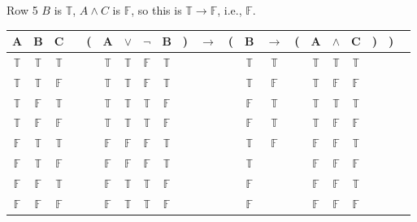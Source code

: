 \documentclass[
  ignorenonframetext,
]{beamer}
\renewcommand{\,}{\text{, }}
\def\True{\mathbb{T}}
\def\False{\mathbb{F}}
\begin{document}
\begin{frame}{Row 5}
\protect\hypertarget{row-5}{}
\(B\) is \(\True\), \(A \wedge C\) is \(\False\), so this is
\(\True \rightarrow \False\), i.e., \(\False\).

\begin{center}

\begin{tabular}{@{ }c@{ }@{ }c@{ }@{ }c | c@{ }@{}c@{}@{ }c@{ }@{ }c@{ }@{ }c@{ }@{ }c@{ }@{}c@{}@{ }c@{ }@{}c@{}@{ }c@{ }@{ }c@{ }@{}c@{}@{ }c@{ }@{ }c@{ }@{ }c@{ }@{}c@{}@{}c@{}@{ }c}
A & B & C &  & ( & A & $\vee$ & $\neg$ & B & ) & $\rightarrow$ & ( & B & $\rightarrow$ & ( & A & $\wedge$ & C & ) & ) & \\
\hline 
 $\True$ & $\True$ & $\True$ &  &  & $\True$ & $\True$ & $\False$ & $\True$ &  &&  & $\True$ & $\True$ &  & $\True$ & $\True$ & $\True$ &  &  & \\
 $\True$ & $\True$ & $\False$ &  &  & $\True$ & $\True$ & $\False$ & $\True$ &  &&  & $\True$ & $\False$ &  & $\True$ & $\False$ & $\False$ &  &  & \\
 $\True$ & $\False$ & $\True$ &  &  & $\True$ & $\True$ & $\True$ & $\False$ &  &&  & $\False$ & $\True$ &  & $\True$ & $\True$ & $\True$ &  &  & \\
 $\True$ & $\False$ & $\False$ &  &  & $\True$ & $\True$ & $\True$ & $\False$ &  &&  & $\False$ & $\True$ &  & $\True$ & $\False$ & $\False$ &  &  & \\
 $\False$ & $\True$ & $\True$ &  &  & $\False$ & $\False$ & $\False$ & $\True$ &  &&  & $\True$ & $\False$ &  & $\False$ & $\False$ & $\True$ &  &  & \\
 $\False$ & $\True$ & $\False$ &  &  & $\False$ & $\False$ & $\False$ & $\True$ &  &&  & $\True$ &&  & $\False$ & $\False$ & $\False$ &  &  & \\
 $\False$ & $\False$ & $\True$ &  &  & $\False$ & $\True$ & $\True$ & $\False$ &  &&  & $\False$ &&  & $\False$ & $\False$ & $\True$ &  &  & \\
 $\False$ & $\False$ & $\False$ &  &  & $\False$ & $\True$ & $\True$ & $\False$ &  &&  & $\False$ &&  & $\False$ & $\False$ & $\False$ &  &  & \\
\end{tabular}

\end{center}
\end{frame}
\end{document}
